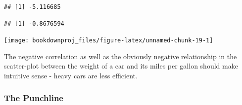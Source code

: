 \documentclass[
]{book}
\newenvironment{Shaded}{\begin{snugshade}}{\end{snugshade}}
\newcommand{\AttributeTok}[1]{\textcolor[rgb]{0.13,0.29,0.53}{#1}}
\newcommand{\CommentTok}[1]{\textcolor[rgb]{0.56,0.35,0.01}{\textit{#1}}}
\newcommand{\DecValTok}[1]{\textcolor[rgb]{0.00,0.00,0.81}{#1}}
\newcommand{\FunctionTok}[1]{\textcolor[rgb]{0.13,0.29,0.53}{\textbf{#1}}}
\newcommand{\NormalTok}[1]{#1}
\newcommand{\SpecialCharTok}[1]{\textcolor[rgb]{0.81,0.36,0.00}{\textbf{#1}}}
\newcommand{\StringTok}[1]{\textcolor[rgb]{0.31,0.60,0.02}{#1}}
\begin{document}
\begin{Shaded}
\end{Shaded}

\begin{verbatim}
## [1] -5.116685
\end{verbatim}

\begin{Shaded}
\end{Shaded}

\begin{verbatim}
## [1] -0.8676594
\end{verbatim}

\begin{Shaded}
\end{Shaded}

\begin{center}\texttt{[image: bookdownproj\_files/figure-latex/unnamed-chunk-19-1]} \end{center}

The negative correlation as well as the obviously negative relationship in the scatter-plot between the weight of a car and its miles per gallon should make intuitive sense - heavy cars are less efficient.

\subsubsection*{The Punchline}\label{the-punchline}
\end{document}
